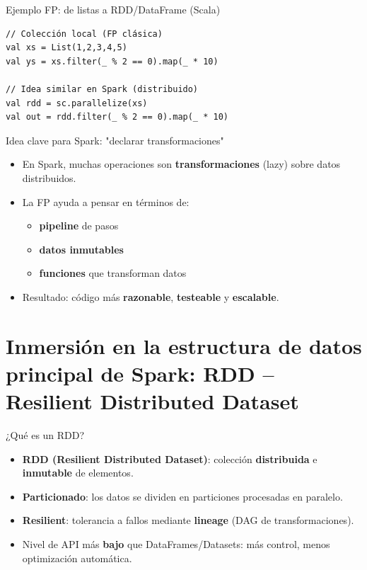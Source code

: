 \documentclass{beamer}
\begin{document}
\begin{frame}[fragile]{Ejemplo FP: de listas a RDD/DataFrame (Scala)}
\begin{verbatim}
// Colección local (FP clásica)
val xs = List(1,2,3,4,5)
val ys = xs.filter(_ % 2 == 0).map(_ * 10)

// Idea similar en Spark (distribuido)
val rdd = sc.parallelize(xs)
val out = rdd.filter(_ % 2 == 0).map(_ * 10)
\end{verbatim}
\end{frame}

\begin{frame}{Idea clave para Spark: "declarar transformaciones"}
\begin{itemize}
  \item En Spark, muchas operaciones son \textbf{transformaciones} (lazy) sobre datos distribuidos.
  \item La FP ayuda a pensar en términos de:
  \begin{itemize}
    \item \textbf{pipeline} de pasos
    \item \textbf{datos inmutables}
    \item \textbf{funciones} que transforman datos
  \end{itemize}
  \item Resultado: código más \textbf{razonable}, \textbf{testeable} y \textbf{escalable}.
\end{itemize}
\end{frame}

\section{Inmersión en la estructura de datos principal de Spark: RDD -- Resilient Distributed Dataset}

\begin{frame}{¿Qué es un RDD?}
\begin{itemize}
  \item \textbf{RDD (Resilient Distributed Dataset)}: colección \textbf{distribuida} e \textbf{inmutable} de elementos.
  \item \textbf{Particionado}: los datos se dividen en particiones procesadas en paralelo.
  \item \textbf{Resilient}: tolerancia a fallos mediante \textbf{lineage} (DAG de transformaciones).
  \item Nivel de API más \textbf{bajo} que DataFrames/Datasets: más control, menos optimización automática.
\end{itemize}
\end{frame}
\end{document}
